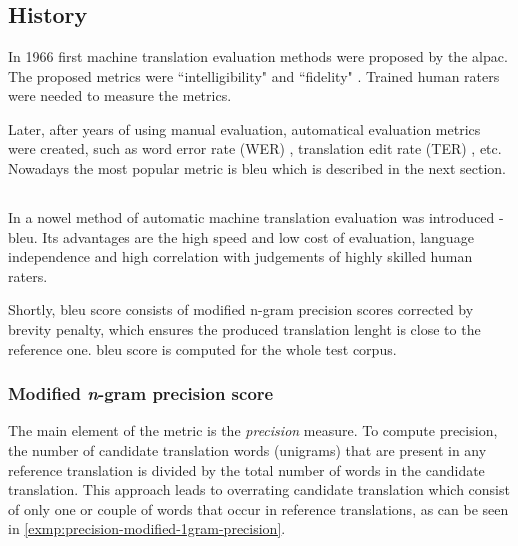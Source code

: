 \section{}

\subsection{History}

In 1966 first machine translation evaluation methods were proposed
by the \acrfull{alpac}.
The proposed metrics were ``intelligibility" and ``fidelity"
\citep[p~67]{Translation1966}.
Trained human raters were needed to measure the metrics.

Later, after years of using manual evaluation, automatical evaluation
metrics were created, such as word error rate (WER) \cite{Su1992},
translation edit rate (TER) \cite{Snover2006}, etc.
Nowadays the most popular metric is \acrfull{bleu} which is described
in the next section.


\subsection{}

In \cite{Papineni02bleu} a nowel method of automatic machine
translation evaluation was introduced - \acrfull{bleu}.
Its advantages are the high speed and low cost of evaluation,
language independence and high correlation with judgements
of highly skilled human raters.

Shortly, \acrshort{bleu} score consists of modified n-gram precision scores
corrected by brevity penalty,
which ensures the produced translation lenght is close to the reference one.
\acrshort{bleu} score is computed for the whole test corpus.

\subsubsection*{Modified \textit{n}-gram precision score}

The main element of the metric is the \textit{precision} measure.
To compute precision, the number of candidate translation words (unigrams) that are present in
any reference translation is divided by the total number of words in the candidate translation.
This approach leads to overrating candidate translation which consist of only one or couple of
words that occur in reference translations, as can be seen in 
\cref{exmp:precision-modified-1gram-precision}.

